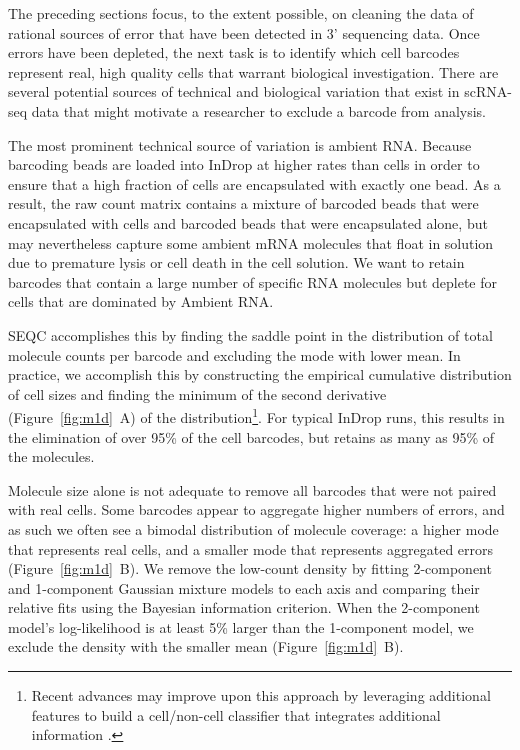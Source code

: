 The preceding sections focus, to the extent possible,  on cleaning the data of rational sources of error that have been detected in 3' sequencing data. 
Once errors have been depleted, the next task is to identify which cell barcodes represent real, high quality cells that warrant biological investigation. 
There are several potential sources of technical and biological variation that exist in scRNA-seq data that might motivate a researcher to exclude a barcode from analysis. 

The most prominent technical source of variation is ambient RNA\@. 
Because barcoding beads are loaded into InDrop at higher rates than cells in order to ensure that a high fraction of cells are encapsulated with exactly one bead. 
As a result, the raw count matrix contains a mixture of barcoded beads that were encapsulated with cells and barcoded beads that were encapsulated alone, but may nevertheless capture some ambient mRNA molecules that float in solution due to premature lysis or cell death in the cell solution. 
We want to retain barcodes that contain a large number of specific RNA molecules but deplete for cells that are dominated by Ambient RNA\@. 

SEQC accomplishes this by finding the saddle point in the distribution of total molecule counts per barcode and excluding the mode with lower mean. 
In practice, we accomplish this by constructing the empirical cumulative distribution of cell sizes and finding the minimum of the second derivative (Figure~\ref{fig:m1d}~A) of the distribution\footnote{Recent advances may improve upon this approach by leveraging additional features to build a cell/non-cell classifier that integrates additional information \citep{Petukhov2017}.}.
For typical InDrop runs, this results in the elimination of over 95\% of the cell barcodes, but retains as many as 95\% of the molecules.

Molecule size alone is not adequate to remove all barcodes that were not paired with real cells. 
Some barcodes appear to aggregate higher numbers of errors, and as such we often see a bimodal distribution of molecule coverage: a higher mode that represents real cells, and a smaller mode that represents aggregated errors (Figure~\ref{fig:m1d}~B). 
We remove the low-count density by fitting 2-component and 1-component Gaussian mixture models to each axis and comparing their relative fits using the Bayesian information criterion. 
When the 2-component model's log-likelihood is at least 5\% larger than the 1-component model, we exclude the density with the smaller mean (Figure~\ref{fig:m1d}~B).

